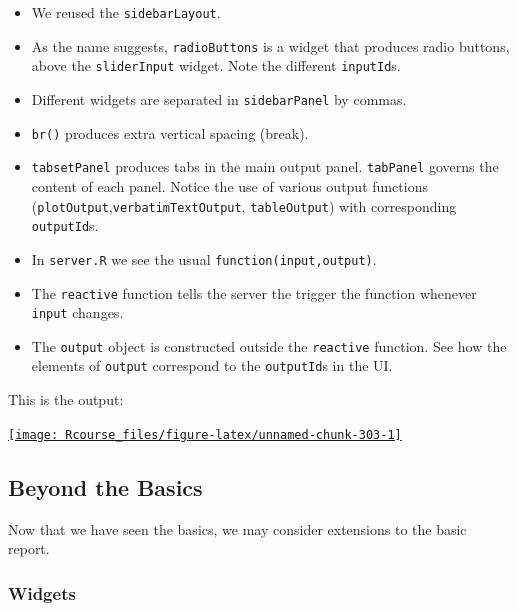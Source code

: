 \documentclass[]{book}
\providecommand{\tightlist}{%
  \setlength{\itemsep}{0pt}\setlength{\parskip}{0pt}}
\theoremstyle{definition}
\theoremstyle{definition}
\theoremstyle{definition}
\theoremstyle{remark}
\begin{document}
\begin{itemize}
\tightlist
\item
  We reused the \texttt{sidebarLayout}.
\item
  As the name suggests, \texttt{radioButtons} is a widget that produces
  radio buttons, above the \texttt{sliderInput} widget. Note the
  different \texttt{inputId}s.
\item
  Different widgets are separated in \texttt{sidebarPanel} by commas.
\item
  \texttt{br()} produces extra vertical spacing (break).
\item
  \texttt{tabsetPanel} produces tabs in the main output panel.
  \texttt{tabPanel} governs the content of each panel. Notice the use of
  various output functions
  (\texttt{plotOutput},\texttt{verbatimTextOutput},
  \texttt{tableOutput}) with corresponding \texttt{outputId}s.
\item
  In \texttt{server.R} we see the usual \texttt{function(input,output)}.
\item
  The \texttt{reactive} function tells the server the trigger the
  function whenever \texttt{input} changes.
\item
  The \texttt{output} object is constructed outside the
  \texttt{reactive} function. See how the elements of \texttt{output}
  correspond to the \texttt{outputId}s in the UI.
\end{itemize}

This is the output:

\href{https://shiny.rstudio.com/gallery/tabsets.html}{\texttt{[image: Rcourse\_files/figure-latex/unnamed-chunk-303-1]} }

\subsection{Beyond the Basics}\label{beyond-the-basics}

Now that we have seen the basics, we may consider extensions to the
basic report.

\subsubsection{Widgets}\label{widgets}
\end{document}

